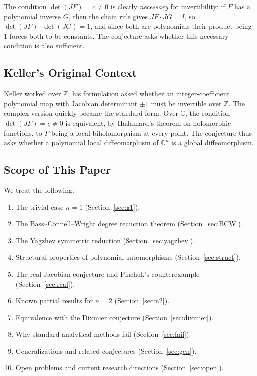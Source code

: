 \documentclass[12pt,a4paper]{amsart}
\theoremstyle{definition}
\theoremstyle{remark}
\begin{document}
The condition $\det(JF) = c \neq 0$ is clearly \emph{necessary} for invertibility:
if $F$ has a polynomial inverse $G$, then the chain rule gives
$JF \cdot JG = I$, so $\det(JF) \cdot \det(JG) = 1$, and since both are
polynomials their product being $1$ forces both to be constants.
The conjecture asks whether this necessary condition is also sufficient.

\subsection{Keller's Original Context}

Keller worked over $\mathbb{Z}$; his formulation asked whether an integer-coefficient
polynomial map with Jacobian determinant $\pm 1$ must be invertible over $\mathbb{Z}$.
The complex version quickly became the standard form. Over $\mathbb{C}$, the condition
$\det(JF) = c \neq 0$ is equivalent, by Hadamard's theorem on holomorphic functions,
to $F$ being a local biholomorphism at every point. The conjecture thus asks whether
a polynomial local diffeomorphism of $\mathbb{C}^n$ is a global diffeomorphism.

\subsection{Scope of This Paper}

We treat the following:
\begin{enumerate}[label=(\roman*)]
  \item The trivial case $n = 1$ (Section~\ref{sec:n1}).
  \item The Bass--Connell--Wright degree reduction theorem (Section~\ref{sec:BCW}).
  \item The Yagzhev symmetric reduction (Section~\ref{sec:yagzhev}).
  \item Structural properties of polynomial automorphisms (Section~\ref{sec:struct}).
  \item The real Jacobian conjecture and Pinchuk's counterexample (Section~\ref{sec:real}).
  \item Known partial results for $n = 2$ (Section~\ref{sec:n2}).
  \item Equivalence with the Dixmier conjecture (Section~\ref{sec:dixmier}).
  \item Why standard analytical methods fail (Section~\ref{sec:fail}).
  \item Generalizations and related conjectures (Section~\ref{sec:gen}).
  \item Open problems and current research directions (Section~\ref{sec:open}).
\end{enumerate}
\end{document}
